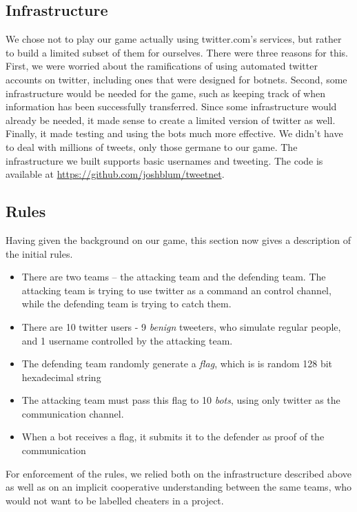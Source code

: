 \documentclass[11pt, oneside]{article} %
\numberwithin{equation}{section} %
\numberwithin{figure}{section} %
\numberwithin{table}{section} %
\begin{document}
	\subsection{Infrastructure}
		We chose not to play our game actually using twitter.com's services,
		but rather to build a limited subset of them for ourselves. There were
		three reasons for this. First, we were worried about the ramifications
		of using automated twitter accounts on twitter, including ones
		that were designed for botnets.
		Second, some infrastructure would be needed for the game, such as
		keeping track of when information has been successfully transferred. Since some infrastructure
		would already be needed, it made sense to create a limited version of twitter as well.
		Finally, it made testing and using the bots much more effective. We didn't have
		to deal with millions of tweets, only those germane to our game.
		The infrastructure we built supports basic usernames and tweeting.
		The code is available at \url{https://github.com/joshblum/tweetnet}.

	\subsection{Rules}
		Having given the background on our game, this section now gives a description
		of the initial rules.
		\begin{itemize}
		 \item There are two teams -- the attacking team and the defending team. The attacking
		 	team is trying to use twitter as a command an control channel, while the defending
			team is trying to catch them.
		 \item There are 10 twitter users - 9 \textit{benign} tweeters, who simulate regular people,
		 	and 1 username controlled by the attacking team.
		 \item The defending team randomly generate a \textit{flag}, which is is random 128 bit
			hexadecimal string
		 \item The attacking team must pass this flag to 10 \textit{bots}, using only twitter
		 	as the communication channel.
		\item When a bot receives a flag, it submits it to the defender as proof of the communication
		\end{itemize}

		For enforcement of the rules, we relied both on the infrastructure described above as well
		as on an implicit cooperative understanding between the same teams, who would not want to
		be labelled cheaters in a project.
\end{document}
